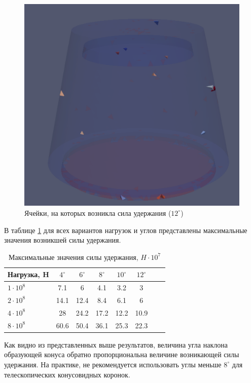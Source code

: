 \documentclass[a4paper, 14pt]{extreport}
\begin{document}
\begin{figure}[H]
	\center
	\includegraphics[scale=0.6]{pictures_diploma/push4-12deg.png}
	\caption{Ячейки, на которых возникла сила удержания ($12^{\circ}$)}
	\label{fig: push4-12deg}
\end{figure}

В таблице \ref{tab: table1} для всех вариантов нагрузок и 
углов представлены максимальные значения возникшей силы 
удержания.

\begin{table}[H]
\centering
\begin{tabular}{l*{6}{c}r}
Нагрузка, H              & $4^{\circ}$ & $6^{\circ}$ & $8^{\circ}$ & $10^{\circ}$ & $12^{\circ}$ \\
\hline
$1 \cdot 10^8$ 	& 7.1 & 6 & 4.1 & 3.2 & 3  \\
$2 \cdot 10^8$     & 14.1 & 12.4 & 8.4 & 6.1 & 6  \\
$4 \cdot 10^8$     & 28 & 24.2 & 17.2 & 12.2 &  10.9  \\
$8 \cdot 10^8$     & 60.6 & 50.4 & 36.1 & 25.3 &  22.3  \\
\end{tabular}
\caption{Максимальные значения силы удержания,  
$H \cdot 10^7$}
\label{tab: table1}
\end{table}

Как видно из представленных выше результатов, величина 
угла наклона образующей конуса обратно пропорциональна величине возникающей силы удержания. На практике, не 
рекомендуется использовать углы меньше $8^{\circ}$ для 
телескопических конусовидных коронок.
\end{document}
